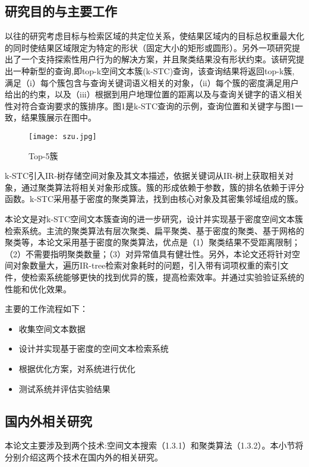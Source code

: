 \subsection{研究目的与主要工作}
以往的研究考虑目标与检索区域的共定位关系，使结果区域内的目标总权重最大化的同时使结果区域限定为特定的形状（固定大小的矩形或圆形）。另外一项研究提出了一个支持探索性用户行为的解决方案，并且聚类结果没有形状约束。该研究提出一种新型的查询,即top-k空间文本簇(k-STC)查询，该查询结果将返回top-k簇, 满足（i）每个簇包含与查询关键词语义相关的对象，（ii）每个簇的密度满足用户给出的约束，以及（iii）根据到用户地理位置的距离以及与查询关键字的语义相关性对符合查询要求的簇排序。图1是k-STC查询的示例，查询位置和关键字与图1一致，结果簇展示在图中。
\begin{figure}[htbp]
	\begin{center}
		\texttt{[image: szu.jpg]}
		\caption{Top-5簇}
		\label{top5cluster}
	\end{center}
\end{figure}

k-STC引入IR-树存储空间对象及其文本描述，依据关键词从IR-树上获取相关对象，通过聚类算法将相关对象形成簇。簇的形成依赖于参数，簇的排名依赖于评分函数。k-STC采用基于密度的聚类算法，找到由核心对象及其密集邻域组成的簇。

本论文是对k-STC空间文本簇查询的进一步研究，设计并实现基于密度空间文本簇检索系统。主流的聚类算法有层次聚类、扁平聚类、基于密度的聚类、基于网格的聚类等，本论文采用基于密度的聚类算法，优点是（1）聚类结果不受距离限制；（2）不需要指明聚类数量；（3）对异常值具有健壮性。另外，本论文还将针对空间对象数量大，遍历IR-tree检索对象耗时的问题，引入带有词项权重的索引文件，使检索系统能够更快的找到优异的簇，提高检索效率。并通过实验验证系统的性能和优化效果。

主要的工作流程如下：
\begin{itemize}
	\item 收集空间文本数据
	\item 设计并实现基于密度的空间文本检索系统
	\item 根据优化方案，对系统进行优化
	\item 测试系统并评估实验结果
\end{itemize}

\subsection{国内外相关研究}
本论文主要涉及到两个技术:空间文本搜索（1.3.1）和聚类算法（1.3.2）。本小节将分别介绍这两个技术在国内外的相关研究。


